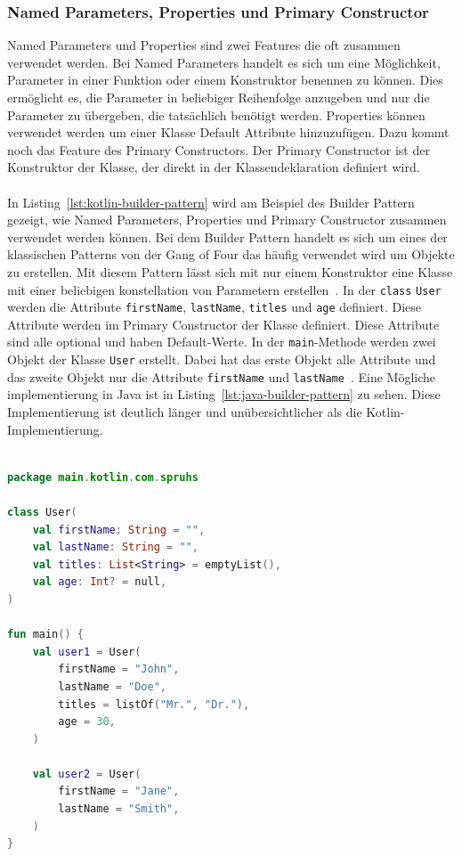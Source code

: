 \documentclass[11pt]{article}
\begin{document}
    \subsubsection{Named Parameters, Properties und Primary Constructor}
    Named Parameters und Properties sind zwei Features die oft zusammen verwendet werden.
    Bei Named Parameters handelt es sich um eine Möglichkeit, Parameter in einer Funktion oder einem Konstruktor benennen zu können.
    Dies ermöglicht es, die Parameter in beliebiger Reihenfolge anzugeben und nur die Parameter zu übergeben, die tatsächlich benötigt werden.
    Properties können verwendet werden um einer Klasse Default Attribute hinzuzufügen.
    Dazu kommt noch das Feature des Primary Constructors.
    Der Primary Constructor ist der Konstruktor der Klasse, der direkt in der Klassendeklaration definiert wird.\\
    \\
    In Listing~\ref{lst:kotlin-builder-pattern} wird am Beispiel des Builder Pattern gezeigt, wie Named Parameters, Properties und Primary Constructor zusammen verwendet werden können.
    Bei dem Builder Pattern handelt es sich um eines der klassischen Patterns von der Gang of Four das häufig verwendet wird um Objekte zu erstellen.
    Mit diesem Pattern lässt sich mit nur einem Konstruktor eine Klasse mit einer beliebigen konstellation von Parametern erstellen~\cite{gang-of-four}.
    In der \texttt{class} \texttt{User} werden die Attribute \texttt{firstName}, \texttt{lastName}, \texttt{titles} und \texttt{age} definiert.
    Diese Attribute werden im Primary Constructor der Klasse definiert.
    Diese Attribute sind alle optional und haben Default-Werte.
    In der \texttt{main}-Methode werden zwei Objekt der Klasse \texttt{User} erstellt.
    Dabei hat das erste Objekt alle Attribute und das zweite Objekt nur die Attribute \texttt{firstName} und \texttt{lastName}~\cite[46]{kotlin-patterns}.
    Eine Mögliche implementierung in Java ist in Listing~\ref{lst:java-builder-pattern} zu sehen.
    Diese Implementierung ist deutlich länger und unübersichtlicher als die Kotlin-Implementierung.\\
    \\

    \begin{lstlisting}[language=Kotlin, caption={Builder.kt}, label={lst:kotlin-builder-pattern}]
package main.kotlin.com.spruhs

class User(
    val firstName: String = "",
    val lastName: String = "",
    val titles: List<String> = emptyList(),
    val age: Int? = null,
)

fun main() {
    val user1 = User(
        firstName = "John",
        lastName = "Doe",
        titles = listOf("Mr.", "Dr."),
        age = 30,
    )

    val user2 = User(
        firstName = "Jane",
        lastName = "Smith",
    )
}
    \end{lstlisting}
\end{document}
